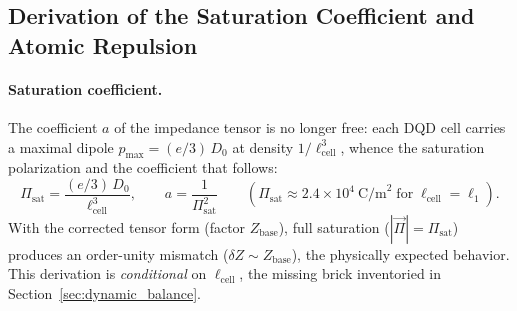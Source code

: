 \documentclass[11pt,a4paper]{article}
\theoremstyle{plain}
\theoremstyle{remark}
\begin{document}
\subsection{Derivation of the Saturation Coefficient and Atomic Repulsion}
\label{sec:atomic_repulsion}

\paragraph{Saturation coefficient.} The coefficient $a$ of the impedance tensor is no longer free: each DQD cell carries a maximal dipole $p_{\max} = (e/3)\,D_0$ at density $1/\ell_{\text{cell}}^3$, whence the saturation polarization and the coefficient that follows:
\begin{equation}\label{eq:pi_sat}
\Pi_{\text{sat}} = \frac{(e/3)\,D_0}{\ell_{\text{cell}}^3}, \qquad a = \frac{1}{\Pi_{\text{sat}}^2}
\qquad \left(\Pi_{\text{sat}} \approx 2.4\times10^{4}~\text{C/m}^2 \;\text{for}\; \ell_{\text{cell}} = \ell_1\right).
\end{equation}
With the corrected tensor form (factor $Z_{\text{base}}$), full saturation ($|\vec{\Pi}| = \Pi_{\text{sat}}$) produces an order-unity mismatch ($\delta Z \sim Z_{\text{base}}$), the physically expected behavior. This derivation is \emph{conditional} on $\ell_{\text{cell}}$, the missing brick inventoried in Section~\ref{sec:dynamic_balance}.
\end{document}
